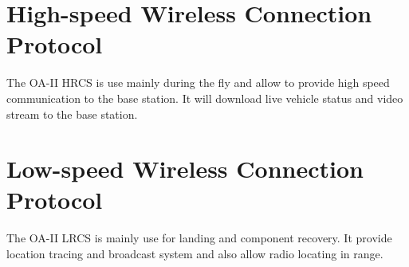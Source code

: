 \documentclass[12pt,article]{memoir}
\begin{document}
\section{High-speed Wireless Connection Protocol}
The OA-II HRCS is use mainly during the fly and allow to provide high speed communication to the base station. It will download live vehicle status and video stream to the base station.
\section{Low-speed Wireless Connection Protocol}
The OA-II LRCS is mainly use for landing and component recovery. It provide location tracing and broadcast system and also allow radio locating in range.


\end{document}
